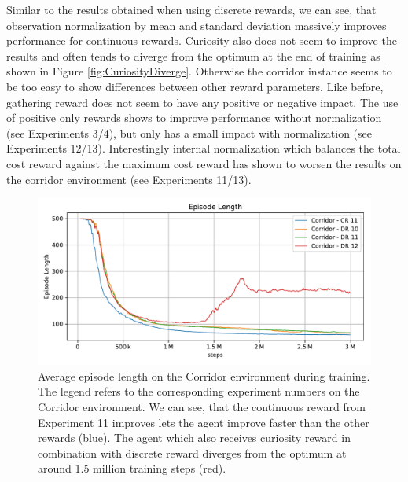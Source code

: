 Similar to the results obtained when using discrete rewards, we can see, that observation normalization by mean and standard deviation massively improves performance for continuous rewards. Curiosity also does not seem to improve the results and often tends to diverge from the optimum at the end of training as shown in Figure \ref{fig:CuriosityDiverge}. Otherwise the corridor instance seems to be too easy to show differences between other reward parameters. Like before, gathering reward does not seem to have any positive or negative impact. The use of positive only rewards shows to improve performance without normalization (see Experiments 3/4), but only has a small impact with normalization (see Experiments 12/13). Interestingly internal normalization which balances the total cost reward against the maximum cost reward has shown to worsen the results on the corridor environment (see Experiments 11/13). 


\begin{figure}[htp]
    
    \begin{center}
        \includegraphics[clip, width=0.75\columnwidth]{figures/evaluation/rewards/continuous_vs_discrete.pdf}
    \end{center}
    
    \caption[Training Curves with Curiosity Reward]{Average episode length on the Corridor environment during training. The legend refers to the corresponding experiment numbers on the Corridor environment. We can see, that the continuous reward from Experiment 11 improves lets the agent improve faster than the other rewards (blue). The agent which also receives curiosity reward in combination with discrete reward diverges from the optimum at around 1.5 million training steps (red).}
    \label{fig:ContinuousVsDiscrete}
\end{figure}

